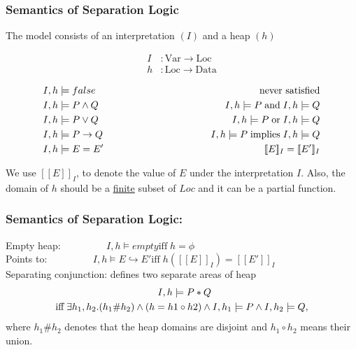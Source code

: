 \documentclass{beamer}
\begin{document}
\begin{frame}
\frametitle{Semantics of Separation Logic}
The model consists of an interpretation $(I)$ and a heap $(h)$

\begin{align*}
    I &: \textrm{Var} \to \textrm{Loc} \\ 
    h &: \textrm{Loc} \to \textrm{Data}
\end{align*}

\begin{align*}
    I,h &\models false \hspace{3.5cm}     & \textrm {never satisfied} \\
    I,h &\models P \land Q \hspace{3.5cm} & I,h \models P \; \textrm{and} \; I,h \models Q \\
    I,h &\models P \lor Q \hspace{3.5cm} & I,h \models P \; \textrm{or} \; I,h \models Q \\
    I,h &\models P \to Q \hspace{3.5cm} & I,h \models P \; \textrm{implies} \; I,h \models Q \\
    I,h &\models E = E' \hspace{3.5cm} & [\![ E ]\!]_I = [\![ E' ]\!]_I
\end{align*}

We use $[\![E]\!]_I$, to denote the value of $E$ under the interpretation $I$. Also, the domain of $h$ should be a \underline{finite} subset of $Loc$ and it can be
a partial function.
\end{frame}

\begin{frame}
\frametitle{Semantics of Separation Logic:}

Empty heap: ~~~~~~~~
   $ I,h \models empty 
    \textrm{iff} \; h = \phi $
\vspace{0.5cm} \\
Points to: ~~~~~~~~
    $I,h \models E \hookrightarrow E' 
    \textrm{iff} \; h([\![ E ]\!]_I) = [\![ E' ]\!]_I $ \\[0.5cm]
Separating conjunction: defines two separate areas of heap
\begin{align*}
    I,h \models P * Q \hspace{3.5cm} \\ 
    \textrm{iff} \; \exists h_1,h_2.(h_1 \# h_2) \land (h = h1 \circ h2) \land I,h_1 \models P \land I,h_2 \models Q,
\end{align*}
where $h_1 \# h_2$ denotes that the heap domains are disjoint and $h_1 \circ h_2$ means their union.
\end{frame}
\end{document}
